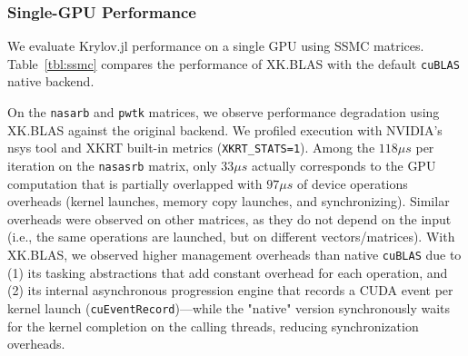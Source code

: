 \documentclass{juliacon}
\DeclareRobustCommand{\arch}[1]{\hyperlink{#1}{#1}}
\begin{document}
\subsubsection{Single-GPU Performance} \label{sec:eval-1-gpu}

\begin{table}[]
\centering
\caption{SSMC matrices and performance obtained on \arch{NV-JLSE} on Krylov.jl Conjugate Gradient implementation. $t_{native}$ and $t_{xk.blas}$ are average times to execute a single iteration of the method, respectively, using the existing \texttt{cuBLAS} backend of Krylov.jl, and our backend built upon XK.BLAS using a single GPU ($G=1$).}
\label{tab:matrices}
\label{tbl:ssmc}
\end{table}

We evaluate Krylov.jl performance on a single GPU using SSMC matrices.
Table~\ref{tbl:ssmc} compares the performance of XK.BLAS with the default \texttt{cuBLAS} native backend.

On the \texttt{nasarb} and \texttt{pwtk} matrices, we observe performance degradation using XK.BLAS against the original backend.
We profiled execution with NVIDIA's nsys tool and XKRT built-in metrics (\texttt{XKRT\_STATS=1}).
Among the $118 \mu s$ per iteration on the \texttt{nasasrb} matrix, only $33 \mu s$ actually corresponds to the GPU computation that is partially overlapped with $97\mu s$ of device operations overheads (kernel launches, memory copy launches, and synchronizing).
Similar overheads were observed on other matrices, as they do not depend on the input (i.e., the same operations are launched, but on different vectors/matrices).
With XK.BLAS, we observed higher management overheads than native \texttt{cuBLAS} due to (1) its tasking abstractions that add constant overhead for each operation, and (2) its internal asynchronous progression engine that records a CUDA event per kernel launch (\texttt{cuEventRecord})---while the "native" version synchronously waits for the kernel completion on the calling threads, reducing synchronization overheads.
\end{document}
